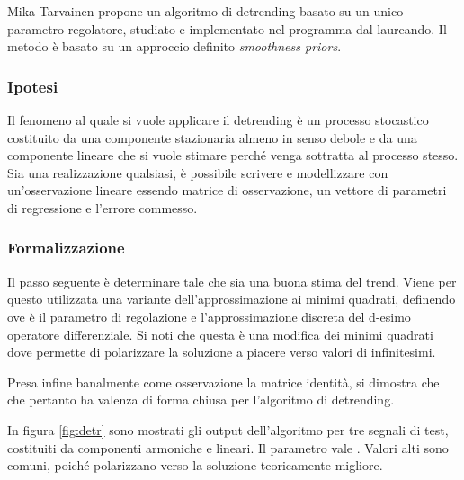 Mika Tarvainen propone \cite{TAR} un algoritmo di detrending basato su un unico parametro regolatore, studiato e implementato nel programma dal laureando. Il metodo è basato su un approccio definito {\em smoothness priors}.
%
		\subsubsection{Ipotesi}
Il fenomeno al quale si vuole applicare il detrending è un processo stocastico costituito da una componente stazionaria almeno in senso debole e da una componente lineare che si vuole stimare perché venga sottratta al processo stesso. Sia  una realizzazione qualsiasi, è possibile scrivere  e modellizzare  con un'osservazione lineare  essendo  matrice di osservazione, \mymath{\mathbf{\theta}} un vettore di parametri di regressione e  l'errore commesso.
%
		\subsubsection{Formalizzazione}
Il passo seguente è determinare \mymath{\tilde{\theta}} tale che  sia una buona stima del trend. Viene per questo utilizzata una variante dell'approssimazione ai minimi quadrati, definendo 
ove \mymath{\lambda} è il parametro di regolazione e  l'approssimazione discreta del d-esimo operatore differenziale. Si noti che questa è una modifica dei minimi quadrati dove \mymath{\lambda} permette di polarizzare la soluzione a piacere verso valori di  infinitesimi. 

Presa infine banalmente come osservazione la matrice identità, si dimostra che  che pertanto ha valenza di forma chiusa per l'algoritmo di detrending.

In figura \ref{fig:detr} sono mostrati gli output dell'algoritmo per tre segnali di test, costituiti da componenti armoniche e lineari. Il parametro \mymath{\lambda} vale . Valori alti sono comuni, poiché polarizzano verso la soluzione teoricamente migliore.
